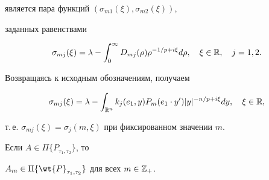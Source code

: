 является пара функций $(\sigma_{m1}(\xi),\sigma_{m2}(\xi))$,


заданных равенствами


$$


\sigma_{mj}(\xi)=\lambda-\int_0^\infty D_{mj}(\rho)


\rho^{-1/p+i\xi}d\rho,\quad


\xi\in{\Bbb R},\quad j=1,2.


$$


Возвращаясь к исходным обозначениям, получаем


$$


\sigma_{mj}(\xi)=\lambda-\int_{{\Bbb R}^n} k_j(e_1,y)P_m(e_1\cdot y')


|y|^{-n/p+i\xi}dy,\quad \xi\in\Bbb R,


$$


т.\,е. $\sigma_{mj}(\xi)=\sigma_j(m,\xi)$ при фиксированном значении $m$.





\begin{lemnonum}




Если $A\in\Pi\{P_{\tau_1,\tau_2}\}$, то


$A_m\in\Pi\{\wt{P}_{\tau_1,\tau_2}\}$ для всех $m\in{\Bbb


Z}_+$.


\end{lemnonum}






